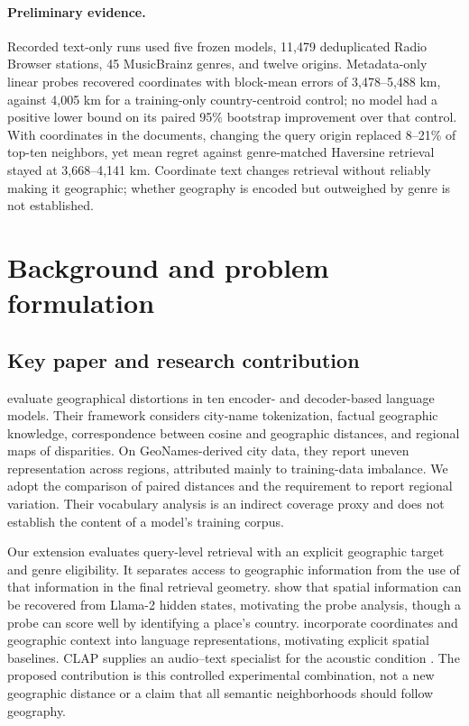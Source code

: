\documentclass[10pt]{article}
\begin{document}
\paragraph{Preliminary evidence.}
Recorded text-only runs used five frozen models, 11,479 deduplicated Radio Browser stations, 45 MusicBrainz genres, and twelve origins. Metadata-only linear probes recovered coordinates with block-mean errors of 3,478--5,488 km, against 4,005 km for a training-only country-centroid control; no model had a positive lower bound on its paired 95\% bootstrap improvement over that control. With coordinates in the documents, changing the query origin replaced 8--21\% of top-ten neighbors, yet mean regret against genre-matched Haversine retrieval stayed at 3,668--4,141 km. Coordinate text changes retrieval without reliably making it geographic; whether geography is encoded but outweighed by genre is not established.
\section{Background and problem formulation}
\subsection{Key paper and research contribution}
\citet{decoupes2025distortions} evaluate geographical distortions in ten encoder- and decoder-based language models. Their framework considers city-name tokenization, factual geographic knowledge, correspondence between cosine and geographic distances, and regional maps of disparities. On GeoNames-derived city data, they report uneven representation across regions, attributed mainly to training-data imbalance. We adopt the comparison of paired distances and the requirement to report regional variation. Their vocabulary analysis is an indirect coverage proxy and does not establish the content of a model's training corpus.

Our extension evaluates query-level retrieval with an explicit geographic target and genre eligibility. It separates access to geographic information from the use of that information in the final retrieval geometry. \citet{gurnee2024space} show that spatial information can be recovered from Llama-2 hidden states, motivating the probe analysis, though a probe can score well by identifying a place's country. \citet{li2023geolm} incorporate coordinates and geographic context into language representations, motivating explicit spatial baselines. CLAP supplies an audio--text specialist for the acoustic condition \citep{wu2023clap}. The proposed contribution is this controlled experimental combination, not a new geographic distance or a claim that all semantic neighborhoods should follow geography.
\end{document}
